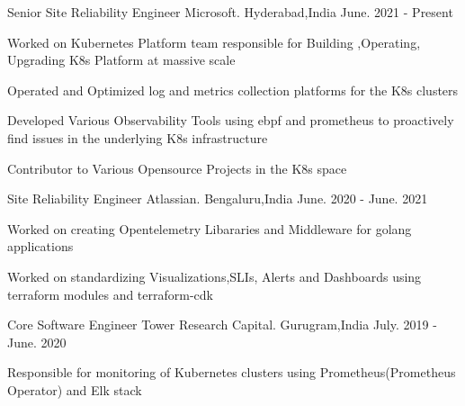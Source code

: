 

\begin{cventries}

    \cventry
    {Senior Site Reliability Engineer} %
    {Microsoft.} %
    {Hyderabad,India} %
    {June. 2021 - Present} %
    {
      \begin{cvitems} %
               \item { Worked on Kubernetes Platform team responsible for Building ,Operating, Upgrading K8s Platform at massive scale }
	       \item { Operated and  Optimized log and metrics collection platforms for the K8s clusters }
	       \item {Developed Various Observability Tools using ebpf and prometheus to proactively find issues in the underlying K8s infrastructure}
               \item { Contributor to Various Opensource Projects in the K8s space } 		
	  \end{cvitems}
    }
    \cventry
    {Site Reliability Engineer} %
    {Atlassian.} %
    {Bengaluru,India} %
    {June. 2020 - June. 2021} %
    {
      \begin{cvitems} %
               \item { Worked on creating Opentelemetry Libararies and Middleware for golang applications }
               \item { Worked on standardizing Visualizations,SLIs, Alerts and Dashboards using terraform modules and terraform-cdk} 		
	  \end{cvitems}
    }
    \cventry
    {Core Software Engineer} %
    {Tower Research Capital.} %
    {Gurugram,India} %
    {July. 2019 - June. 2020} %
    {
      \begin{cvitems} %
	    \item { Responsible for monitoring of  Kubernetes clusters using Prometheus(Prometheus Operator) and Elk stack }

\end{cvitems}}
\end{cventries}

